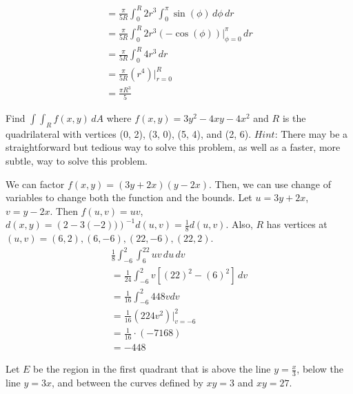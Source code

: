 \documentclass[12pt]{exam}
\begin{document}
\begin{questions}
\begin{solution}
\begin{gather*}
			= \frac{\pi}{5R}\int_{0}^{R} 2 r^3 \int_{0}^{\pi} \sin(\phi)\, d\phi \, dr \\
			= \frac{\pi}{5R}\int_{0}^{R} 2 r^3 \left(-\cos(\phi)\right)|_{\phi = 0}^{\pi} \, dr \\
			= \frac{\pi}{5R}\int_{0}^{R} 4 r^3 \, dr \\
			= \frac{\pi}{5R} \left(r^4\right)|_{r=0}^{R} \\
			= \boxed{\frac{\pi R^3}{5}} \tag*{\qed}
		\end{gather*}
	\end{solution}
	\clearpage
\question Find $\int\int_R f(x, y)\, dA$ where $f(x, y) = 3y^2 - 4xy - 4x^2$ and $R$ is the quadrilateral with vertices (0, 2), (3, 0), (5, 4), and (2, 6). $Hint$: There may be a straightforward but tedious way to solve this problem, as well as a faster, more subtle, way to solve this problem.
	\begin{solution}
		We can factor $f(x, y) = (3y+2x)(y-2x)$. Then, we can use change of variables to change both the function and the bounds. Let $u = 3y + 2x$, $v = y - 2x$. Then $f(u, v) = uv$, $d(x, y) = \left(2 - 3(-2))\right)^{-1} d(u, v) = \frac{1}{8}d(u, v)$. Also, $R$ has vertices at $(u, v) = (6, 2), (6, -6), (22, -6), (22, 2)$.\\
		\begin{gather*}
			\frac{1}{8} \int_{-6}^{2} \int_{6}^{22} uv \, du\, dv \\
			= \frac{1}{24} \int_{-6}^{2} v \left[\left(22\right)^2 - \left(6\right)^2 \right]\, dv \\
			= \frac{1}{16} \int_{-6}^{2} 448 v dv \\
			= \frac{1}{16} \left(224 v^2\right)|_{v=-6}^{2} \\
			= \frac{1}{16} \cdot (-7168) \\
			= \boxed{- 448} \tag*{\qed}
		\end{gather*}
	\end{solution}
	\clearpage
\question Let $E$ be the region in the ﬁrst quadrant that is above the line $y = \frac{x}{3}$, below the line $y = 3x$, and
between the curves deﬁned by $xy = 3$ and $xy = 27$.
	\begin{parts}

\end{parts}
\end{questions}
\end{document}

